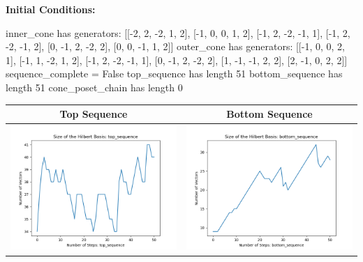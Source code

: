 \documentclass[10pt]{article}
\begin{document}
\textbf{Initial Conditions:}
\begin{SAGE}
inner_cone has generators: 
[[-2, 2, -2, 1, 2], [-1, 0, 0, 1, 2], [-1, 2, -2, -1, 1], [-1, 2, -2, -1, 2], [0, -1, 2, -2, 2], [0, 0, -1, 1, 2]]
outer_cone has generators: 
[[-1, 0, 0, 2, 1], [-1, 1, -2, 1, 2], [-1, 2, -2, -1, 1], [0, -1, 2, -2, 2], [1, -1, -1, 2, 2], [2, -1, 0, 2, 2]]
	sequence_complete = False
	top_sequence has length 51
	bottom_sequence has length 51
	cone_poset_chain has length 0

\end{SAGE}
\begin{tabular}{c|c}
\textbf{Top Sequence} & \textbf{Bottom Sequence} \\ \hline 
\begin{minipage}{.45\textwidth}
\includegraphics[width=\textwidth]{"DATA/5d/6 generators 2 bound G alternating/top_sequence SIZE"}
\end{minipage} &
\begin{minipage}{.45\textwidth}
\includegraphics[width=\textwidth]{"DATA/5d/6 generators 2 bound G alternating/bottom_sequence SIZE"}

\end{minipage}
\end{tabular}
\end{document}
